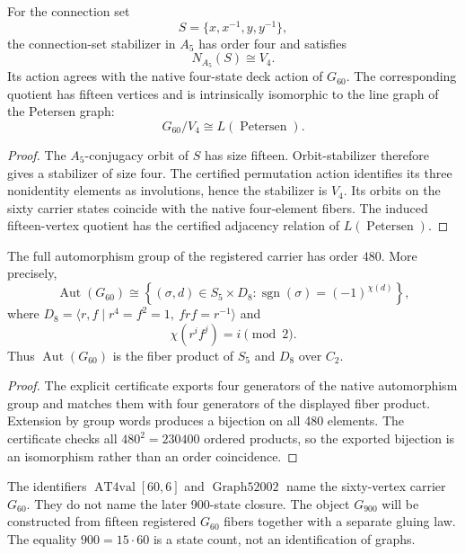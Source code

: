 \begin{proposition}
For the connection set
\[
    S=\{x,x^{-1},y,y^{-1}\},
\]
the connection-set stabilizer in \(A_{5}\) has order four and satisfies
\[
    N_{A_{5}}(S)\cong V_{4}.
\]
Its action agrees with the native four-state deck action of \(G_{60}\).
The corresponding quotient has fifteen vertices and is intrinsically
isomorphic to the line graph of the Petersen graph:
\[
    G_{60}/V_{4}\cong L(\operatorname{Petersen}).
\]
\end{proposition}

\begin{proof}
The \(A_{5}\)-conjugacy orbit of \(S\) has size fifteen.  Orbit-stabilizer
therefore gives a stabilizer of size four.  The certified permutation
action identifies its three nonidentity elements as involutions, hence the
stabilizer is \(V_{4}\).  Its orbits on the sixty carrier states coincide
with the native four-element fibers.  The induced fifteen-vertex quotient
has the certified adjacency relation of \(L(\operatorname{Petersen})\).
\end{proof}

\begin{proposition}
The full automorphism group of the registered carrier has order \(480\).
More precisely,
\[
    \operatorname{Aut}(G_{60})
    \cong
    \left\{
        (\sigma,d)\in S_{5}\times D_{8}
        :
        \operatorname{sgn}(\sigma)=(-1)^{\chi(d)}
    \right\},
\]
where \(D_{8}=\langle r,f\mid r^{4}=f^{2}=1,\ frf=r^{-1}\rangle\) and
\[
    \chi(r^{i}f^{j})=i\pmod 2.
\]
Thus \(\operatorname{Aut}(G_{60})\) is the fiber product of \(S_{5}\) and
\(D_{8}\) over \(C_{2}\).
\end{proposition}

\begin{proof}
The explicit certificate exports four generators of the native
automorphism group and matches them with four generators of the displayed
fiber product.  Extension by group words produces a bijection on all 480
elements.  The certificate checks all \(480^{2}=230400\) ordered products,
so the exported bijection is an isomorphism rather than an order
coincidence.
\end{proof}

\begin{remark}
The identifiers \(\operatorname{AT4val}[60,6]\) and
\(\operatorname{Graph52002}\) name the sixty-vertex carrier \(G_{60}\).
They do not name the later 900-state closure.  The object \(G_{900}\) will
be constructed from fifteen registered \(G_{60}\) fibers together with a
separate gluing law.  The equality \(900=15\cdot60\) is a state count, not
an identification of graphs.
\end{remark}

